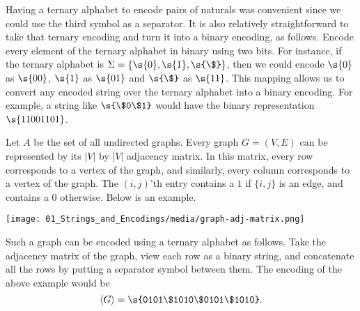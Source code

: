 \begin{example} \label{example:Binary-encoding-of-pairs-of-naturals}
Having a ternary alphabet to encode pairs of naturals was convenient since we could use the third symbol as a separator. It is also relatively straightforward to take that ternary encoding and turn it into a binary encoding, as follows. Encode every element of the ternary alphabet in binary using two bits. For instance, if the ternary alphabet is $\Sigma = \{\s{0},\s{1},\s{\$}\}$, then we could encode $\s{0}$ as $\s{00}$, $\s{1}$ as $\s{01}$ and $\s{\$}$ as $\s{11}$. This mapping allows us to convert any encoded string over the ternary alphabet into a binary encoding. For example, a string like $\s{\$0\$1}$ would have the binary representation $\s{11001101}$.
\end{example}

\begin{example} \label{example:Ternary-encoding-of-graphs}
Let $A$ be the set of all undirected graphs. Every graph $G=(V,E)$ can be represented by its $|V|$ by $|V|$ adjacency matrix. In this matrix, every row corresponds to a vertex of the graph, and similarly, every column corresponds to a vertex of the graph. The $(i,j)$'th entry contains a $1$ if $\{i, j\}$ is an edge, and contains a $0$ otherwise. Below is an example.
\begin{center}
    \texttt{[image: 01\_Strings\_and\_Encodings/media/graph-adj-matrix.png]}
\end{center}
Such a graph can be encoded using a ternary alphabet as follows. Take the adjacency matrix of the graph, view each row as a binary string, and concatenate all the rows by putting a separator symbol between them. The encoding of the above example would be
\[
\langle G \rangle = \s{0101\$1010\$0101\$1010}.
\]
\end{example}

